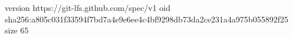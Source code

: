 version https://git-lfs.github.com/spec/v1
oid sha256:a805c031f33594f7bd7a4e9e6ee4c4bf9298db73da2ce231a4a975b055892f25
size 65
